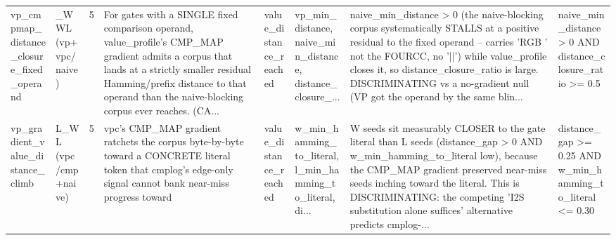 \documentclass[7pt]{extarticle}
\begin{document}
{\begin{longtable}{@{}p{2.4cm}p{1.9cm}rp{4.3cm}p{1.5cm}p{1.7cm}p{4.6cm}p{3.0cm}@{}}
vp\_\allowbreak cmpmap\_\allowbreak distance\_\allowbreak closure\_\allowbreak fixed\_\allowbreak operand & \_\allowbreak WWL (vp+vpc/naive) & 5 & For gates with a SINGLE fixed comparison operand, value\_\allowbreak profile's CMP\_\allowbreak MAP gradient admits a corpus that lands at a strictly smaller residual Hamming/prefix distance to that operand than the naive-blocking corpus ever reaches. (CA... & value\_\allowbreak distance\_\allowbreak reached & vp\_\allowbreak min\_\allowbreak distance, naive\_\allowbreak min\_\allowbreak distance, distance\_\allowbreak closure\_\allowbreak ... & naive\_\allowbreak min\_\allowbreak distance \textgreater{} 0 (the naive-blocking corpus systematically STALLS at a positive residual to the fixed operand -- carries 'RGB ' not the FOURCC, no '||') while value\_\allowbreak profile closes it, so distance\_\allowbreak closure\_\allowbreak ratio is large. DISCRIMINATING vs a no-gradient null (VP got the operand by the same blin... & naive\_\allowbreak min\_\allowbreak distance \textgreater{} 0 AND distance\_\allowbreak closure\_\allowbreak ratio \textgreater{}= 0.5\\
vp\_\allowbreak gradient\_\allowbreak value\_\allowbreak distance\_\allowbreak climb & L\_\allowbreak WL (vpc/cmp+naive) & 5 & vpc's CMP\_\allowbreak MAP gradient ratchets the corpus byte-by-byte toward a CONCRETE literal token that cmplog's edge-only signal cannot bank near-miss progress toward & value\_\allowbreak distance\_\allowbreak reached & w\_\allowbreak min\_\allowbreak hamming\_\allowbreak to\_\allowbreak literal, l\_\allowbreak min\_\allowbreak hamming\_\allowbreak to\_\allowbreak literal, di... & W seeds sit measurably CLOSER to the gate literal than L seeds (distance\_\allowbreak gap \textgreater{} 0 AND w\_\allowbreak min\_\allowbreak hamming\_\allowbreak to\_\allowbreak literal low), because the CMP\_\allowbreak MAP gradient preserved near-miss seeds inching toward the literal. This is DISCRIMINATING: the competing 'I2S substitution alone suffices' alternative predicts cmplog-... & distance\_\allowbreak gap \textgreater{}= 0.25 AND w\_\allowbreak min\_\allowbreak hamming\_\allowbreak to\_\allowbreak literal \textless{}= 0.30\\

\end{longtable}}
\end{document}
